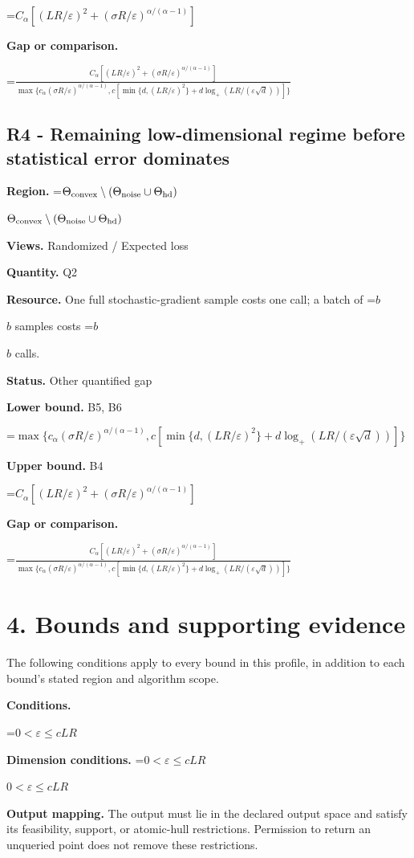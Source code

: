 \documentclass[10pt,a4paper]{article}
\newcommand{\AtlasMath}[1]{\par\begingroup\centering\setbox0=\hbox{$\displaystyle #1$}\ifdim\wd0>1.4\linewidth\typeout{ATLAS WIDE FORMULA: \the\wd0}\fi\ifdim\wd0>\linewidth\resizebox{\linewidth}{!}{\box0}\else\box0\fi\par\endgroup}
\newcommand{\AtlasInlineMath}[1]{\begingroup\setbox0=\hbox{$#1$}\ifdim\wd0>.4\linewidth\endgroup\AtlasMath{#1}\else\endgroup$#1$\fi}
\begin{document}
\AtlasMath{C_\alpha[(LR/\varepsilon)^2+(\sigma R/\varepsilon)^{\alpha/(\alpha-1)}]}
\textbf{Gap or comparison.} 
\AtlasMath{\frac{C_\alpha[(LR/\varepsilon)^2+(\sigma R/\varepsilon)^{\alpha/(\alpha-1)}]}{\max\{c_\alpha (\sigma R/\varepsilon)^{\alpha/(\alpha-1)},c[\min\{d,(LR/\varepsilon)^2\}+d\log_+(LR/(\varepsilon\sqrt d))]\}}}


\subsection{R4 - Remaining low-dimensional regime before statistical error dominates}
\textbf{Region.} \AtlasInlineMath{\Theta_{\rm convex}\setminus(\Theta_{\rm noise}\cup\Theta_{\rm hd})}

\textbf{Views.} Randomized / Expected loss

\textbf{Quantity.} Q2

\textbf{Resource.} One full stochastic-gradient sample costs one call; a batch of \AtlasInlineMath{b} samples costs \AtlasInlineMath{b} calls.

\textbf{Status.} Other quantified gap

\textbf{Lower bound.} B5, B6

\AtlasMath{\max\{c_\alpha (\sigma R/\varepsilon)^{\alpha/(\alpha-1)},c[\min\{d,(LR/\varepsilon)^2\}+d\log_+(LR/(\varepsilon\sqrt d))]\}}
\textbf{Upper bound.} B4

\AtlasMath{C_\alpha[(LR/\varepsilon)^2+(\sigma R/\varepsilon)^{\alpha/(\alpha-1)}]}
\textbf{Gap or comparison.} 
\AtlasMath{\frac{C_\alpha[(LR/\varepsilon)^2+(\sigma R/\varepsilon)^{\alpha/(\alpha-1)}]}{\max\{c_\alpha (\sigma R/\varepsilon)^{\alpha/(\alpha-1)},c[\min\{d,(LR/\varepsilon)^2\}+d\log_+(LR/(\varepsilon\sqrt d))]\}}}


\section{4. Bounds and supporting evidence}
The following conditions apply to every bound in this profile, in addition to each bound's stated region and algorithm scope.

\textbf{Conditions.} 
\AtlasMath{0<\varepsilon\le cLR}


\textbf{Dimension conditions.} \AtlasInlineMath{0<\varepsilon\le cLR}

\textbf{Output mapping.} The output must lie in the declared output space and satisfy its feasibility, support, or atomic-hull restrictions. Permission to return an unqueried point does not remove these restrictions.
\end{document}
